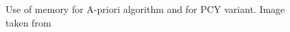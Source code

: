 \documentclass[12pt,%
               a4paper,%
               oneside,openany,%
               titlepage,%
               headinclude,footinclude,%
               BCOR5mm,%
               cleardoublepage=empty,%
               tablecaptionabove,%
               floatperchapter,
               ]{scrreprt}                 %
\begin{document}
\begin{figure}[ht]
\caption{Use of memory for A-priori algorithm and for PCY variant. Image taken from \cite{leskovec2020mining}}
\label{Support distribution_ALL}
\end{figure}
\end{document}
